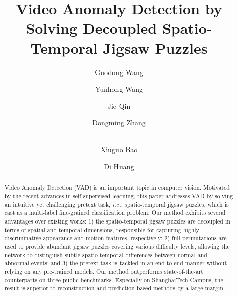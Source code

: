 \documentclass[runningheads]{llncs}
\begin{document}
\pagestyle{headings}
\mainmatter
\def\ECCVSubNumber{6451}  

\title{Video Anomaly Detection by Solving Decoupled Spatio-Temporal Jigsaw Puzzles} 

\begin{comment}
\titlerunning{ECCV-22 submission ID \ECCVSubNumber} 
\authorrunning{ECCV-22 submission ID \ECCVSubNumber} 
\author{Anonymous ECCV submission}
\institute{Paper ID \ECCVSubNumber}
\end{comment}


\author{Guodong Wang \and
Yunhong Wang \and
Jie Qin \and
Dongming Zhang \and \\
Xiuguo Bao \and
Di Huang}

\maketitle

\begin{abstract}

    Video Anomaly Detection (VAD) is an important topic in computer vision. Motivated by the recent advances in self-supervised learning, this paper addresses VAD by solving an intuitive yet challenging pretext task, \emph{i.e.}, spatio-temporal jigsaw puzzles, which is cast as a multi-label fine-grained classification problem. Our method exhibits several advantages over existing works: 1) the spatio-temporal jigsaw puzzles are decoupled in terms of spatial and temporal dimensions, responsible for capturing highly discriminative appearance and motion features, respectively; 2) full permutations are used to provide abundant jigsaw puzzles covering various difficulty levels, allowing the network to distinguish subtle spatio-temporal differences between normal and abnormal events; and 3) the pretext task is tackled in an end-to-end manner without relying on any pre-trained models. Our method outperforms state-of-the-art counterparts on three public benchmarks. Especially on ShanghaiTech Campus, the result is superior to reconstruction and prediction-based methods by a large margin.

\end{abstract}
\end{document}
